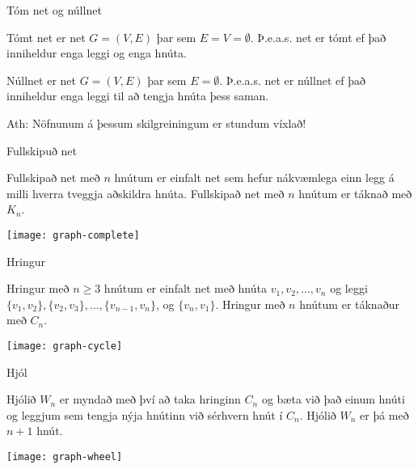 \documentclass{beamer}
\begin{document}
\begin{frame}{Tóm net og núllnet}
\begin{tcolorbox}[title=Tómt net]
Tómt net er net $G = (V, E)$ þar sem $E = V = \emptyset$. Þ.e.a.s. net er tómt ef það inniheldur enga leggi og enga hnúta.
\end{tcolorbox}

\begin{tcolorbox}[title=Núllnet]
Núllnet er net $G = (V, E)$ þar sem $E = \emptyset$. Þ.e.a.s. net er núllnet ef það inniheldur enga leggi til að tengja hnúta þess saman.
\end{tcolorbox}
Ath: Nöfnunum á þessum skilgreiningum er stundum víxlað!
\end{frame}

\begin{frame}{Fullskipuð net}
\begin{tcolorbox}[title=Fullskipað net]
Fullskipað net með $n$ hnútum er einfalt net sem hefur nákvæmlega einn legg á milli hverra tveggja aðskildra hnúta. Fullskipað net með $n$ hnútum er táknað með $K_n$.
\end{tcolorbox}

\begin{center}
\texttt{[image: graph-complete]}
\end{center}

\end{frame}

\begin{frame}{Hringur}
\begin{tcolorbox}[title=Hringur]
Hringur með $n \geq 3$ hnútum er einfalt net með hnúta $v_1, v_2, \ldots, v_n$ og leggi $\{v_1 , v_2\},
\{v_2 , v_3 \}, \ldots , \{v_{n-1} , v_n \}$, og $\{v_n , v_1 \}$. Hringur með $n$ hnútum er táknaður með $C_n$.
\end{tcolorbox}

\begin{center}
\texttt{[image: graph-cycle]}
\end{center}

\end{frame}

\begin{frame}{Hjól}
\begin{tcolorbox}[title=Hjól]
Hjólið $W_n$ er myndað með því að taka hringinn $C_n$ og bæta við það einum hnúti og leggjum sem tengja nýja hnútinn við sérhvern hnút í $C_n$. Hjólið $W_n$ er þá með $n+1$ hnút.
\end{tcolorbox}

\begin{center}
\texttt{[image: graph-wheel]}
\end{center}
\end{frame}
\end{document}

